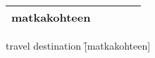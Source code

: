 
\begin{center}
  \begin{tabular}{|c c c c c|}
    \hline
    matkakohteen &&&& \\
    \hline
  \end{tabular}
\end{center}

\begin{questions}
  \begin{multicols}{3}
    \raggedcolumns
    \question travel destination \f[matkakohteen]
  \end{multicols}
\end{questions}
